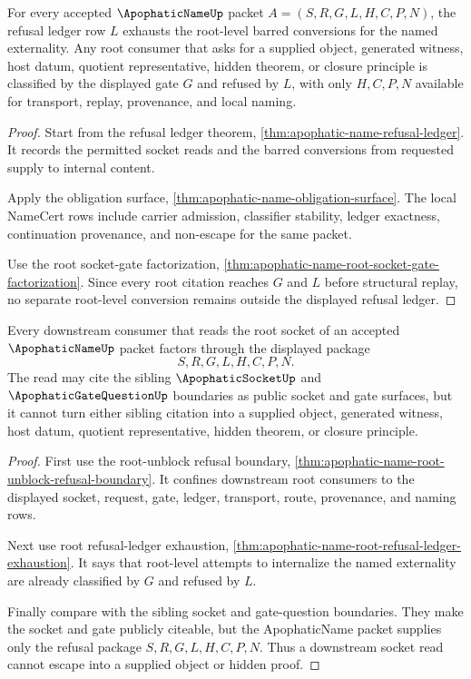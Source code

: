 \begin{theorem}
\label{thm:apophatic-name-root-refusal-ledger-exhaustion}
For every accepted $\ApophaticNameUp$ packet $A=(S,R,G,L,H,C,P,N)$, the refusal ledger row $L$ exhausts the root-level barred conversions for the named externality. Any root consumer that asks for a supplied object, generated witness, host datum, quotient representative, hidden theorem, or closure principle is classified by the displayed gate $G$ and refused by $L$, with only $H,C,P,N$ available for transport, replay, provenance, and local naming.
\end{theorem}
\begin{proof}
Start from the refusal ledger theorem, \autoref{thm:apophatic-name-refusal-ledger}. It records the permitted socket reads and the barred conversions from requested supply to internal content.

Apply the obligation surface, \autoref{thm:apophatic-name-obligation-surface}. The local NameCert rows include carrier admission, classifier stability, ledger exactness, continuation provenance, and non-escape for the same packet.

Use the root socket-gate factorization, \autoref{thm:apophatic-name-root-socket-gate-factorization}. Since every root citation reaches $G$ and $L$ before structural replay, no separate root-level conversion remains outside the displayed refusal ledger.
\end{proof}

\begin{theorem}
\label{thm:apophatic-name-root-downstream-socket-nonescape}
Every downstream consumer that reads the root socket of an accepted $\ApophaticNameUp$ packet factors through the displayed package
$$
S,R,G,L,H,C,P,N.
$$
The read may cite the sibling $\ApophaticSocketUp$ and $\ApophaticGateQuestionUp$ boundaries as public socket and gate surfaces, but it cannot turn either sibling citation into a supplied object, generated witness, host datum, quotient representative, hidden theorem, or closure principle.
\end{theorem}
\begin{proof}
First use the root-unblock refusal boundary, \autoref{thm:apophatic-name-root-unblock-refusal-boundary}. It confines downstream root consumers to the displayed socket, request, gate, ledger, transport, route, provenance, and naming rows.

Next use root refusal-ledger exhaustion, \autoref{thm:apophatic-name-root-refusal-ledger-exhaustion}. It says that root-level attempts to internalize the named externality are already classified by $G$ and refused by $L$.

Finally compare with the sibling socket and gate-question boundaries. They make the socket and gate publicly citeable, but the ApophaticName packet supplies only the refusal package $S,R,G,L,H,C,P,N$. Thus a downstream socket read cannot escape into a supplied object or hidden proof.
\end{proof}
